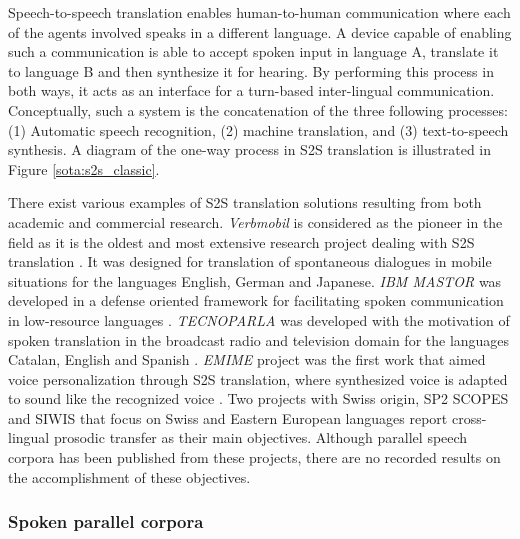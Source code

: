 Speech-to-speech translation enables human-to-human communication where each of the agents involved speaks in a different language. A device capable of enabling such a communication is able to accept spoken input in language A, translate it to language B and then synthesize it for hearing. By performing this process in both ways, it acts as an interface for a turn-based inter-lingual communication. Conceptually, such a system is the concatenation of the three following processes: (1) Automatic speech recognition, (2) machine translation, and (3) text-to-speech synthesis. A diagram of the one-way process in S2S translation is illustrated in Figure \ref{sota:s2s_classic}. 

There exist various examples of S2S translation solutions resulting from both academic and commercial research. \textit{Verbmobil} is considered as the pioneer in the field as it is the oldest and most extensive research project dealing with S2S translation \citep{wahlster2013verbmobil}. It was designed for translation of spontaneous dialogues in mobile situations for the languages English, German and Japanese. \textit{IBM MASTOR} was developed in a defense oriented framework for facilitating spoken communication in low-resource languages \citep{ibm_mastor}. \textit{TECNOPARLA} was developed with the motivation of spoken translation in the broadcast radio and television domain for the languages Catalan, English and Spanish \citep{tecnoparla}. \textit{EMIME} project was the first work that aimed voice personalization through S2S translation, where synthesized voice is adapted to sound like the recognized voice \citep{emimeemime}. Two projects with Swiss origin, SP2 SCOPES \citep{sp2} and SIWIS \citep{Garner:199815} that focus on Swiss and Eastern European languages report cross-lingual prosodic transfer as their main objectives. Although parallel speech corpora has been published from these projects, there are no recorded results on the accomplishment of these objectives. 

\subsubsection{Spoken parallel corpora}


